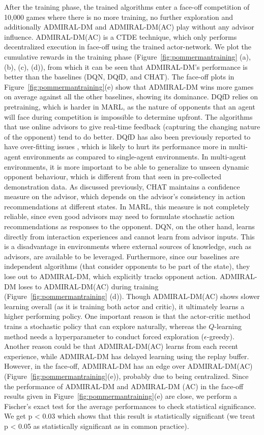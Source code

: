 \documentclass[jair, twoside,11pt,theapa]{article}
\begin{document}
 After the training phase, the trained algorithms enter a face-off competition of 10,000 games where there is no more training, no further exploration and additionally ADMIRAL-DM and ADMIRAL-DM(AC) play without any advisor influence. ADMIRAL-DM(AC) is a CTDE technique, which 
 only performs decentralized execution in face-off using the trained actor-network.
 We plot the cumulative rewards in the training phase (Figure~\ref{fig:pommermantraining} (a), (b), (c), (d)), from which it can be seen that ADMIRAL-DM's performance is better than the baselines (DQN, DQfD, and CHAT). The face-off plots in Figure~\ref{fig:pommermantraining}(e) show that ADMIRAL-DM wins more games on average against all the other baselines, showing its dominance. DQfD relies on pretraining, which is harder in MARL, as the nature of opponents that an agent will face during competition is impossible to determine upfront. The algorithms that use online advisors to give real-time feedback (capturing the changing nature of the opponent) tend to do better. DQfD has also been previously reported to have over-fitting issues \citep{gao2018reinforcement}, which is likely to hurt its performance more in multi-agent environments as compared to single-agent environments. In multi-agent environments, it is more important to be able to generalize to unseen dynamic opponent behaviour, which is different from that seen in pre-collected demonstration data. As discussed previously, CHAT maintains a confidence measure on the advisor, which depends on the advisor's consistency in action recommendations at different states. In MARL, this measure is not completely reliable, since even good advisors may need to formulate stochastic action recommendations as responses to the opponent. DQN, on the other hand, learns directly from interaction experiences and cannot learn from advisor inputs. This is a disadvantage in environments where external sources of knowledge, such as advisors, are available to be leveraged. 
 Furthermore, since our baselines are independent algorithms (that consider opponents to be part of the state), they lose out to ADMIRAL-DM, which explicitly tracks opponent action. ADMIRAL-DM loses to ADMIRAL-DM(AC) during training (Figure~\ref{fig:pommermantraining} (d)). Though ADMIRAL-DM(AC) shows slower learning overall  (as it is training both actor and critic), it ultimately learns a higher performing policy. One important reason is that the actor-critic method trains a stochastic policy that can explore naturally, whereas the $Q$-learning method needs a hyperparameter to conduct forced exploration ($\epsilon$-greedy). Another reason could be that ADMIRAL-DM(AC) learns from each recent experience, while ADMIRAL-DM has delayed learning using the replay buffer. However, in the face-off, ADMIRAL-DM has an edge over ADMIRAL-DM(AC) (Figure~\ref{fig:pommermantraining}(e)), probably due to being centralized. Since the performance of ADMIRAL-DM and ADMIRAL-DM (AC) in the face-off results given in Figure~\ref{fig:pommermantraining}(e) are close, we perform a Fischer's exact test for the average performances to check statistical significance. We get p < 0.03 which shows that this result is statistically significant (we treat p < 0.05 as statistically significant as in common practice).  
\end{document}
